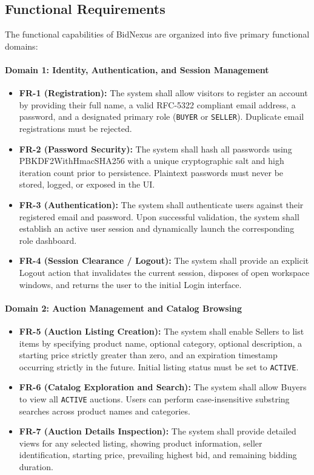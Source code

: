 \subsection{Functional Requirements}
The functional capabilities of BidNexus are organized into five primary functional domains:

\paragraph{Domain 1: Identity, Authentication, and Session Management}
\begin{itemize}
    \item \textbf{FR-1 (Registration):} The system shall allow visitors to register an account by providing their full name, a valid RFC-5322 compliant email address, a password, and a designated primary role (\texttt{BUYER} or \texttt{SELLER}). Duplicate email registrations must be rejected.
    \item \textbf{FR-2 (Password Security):} The system shall hash all passwords using PBKDF2WithHmacSHA256 with a unique cryptographic salt and high iteration count prior to persistence. Plaintext passwords must never be stored, logged, or exposed in the UI.
    \item \textbf{FR-3 (Authentication):} The system shall authenticate users against their registered email and password. Upon successful validation, the system shall establish an active user session and dynamically launch the corresponding role dashboard.
    \item \textbf{FR-4 (Session Clearance / Logout):} The system shall provide an explicit Logout action that invalidates the current session, disposes of open workspace windows, and returns the user to the initial Login interface.
\end{itemize}

\paragraph{Domain 2: Auction Management and Catalog Browsing}
\begin{itemize}
    \item \textbf{FR-5 (Auction Listing Creation):} The system shall enable Sellers to list items by specifying product name, optional category, optional description, a starting price strictly greater than zero, and an expiration timestamp occurring strictly in the future. Initial listing status must be set to \texttt{ACTIVE}.
    \item \textbf{FR-6 (Catalog Exploration and Search):} The system shall allow Buyers to view all \texttt{ACTIVE} auctions. Users can perform case-insensitive substring searches across product names and categories.
    \item \textbf{FR-7 (Auction Details Inspection):} The system shall provide detailed views for any selected listing, showing product information, seller identification, starting price, prevailing highest bid, and remaining bidding duration.
\end{itemize}

